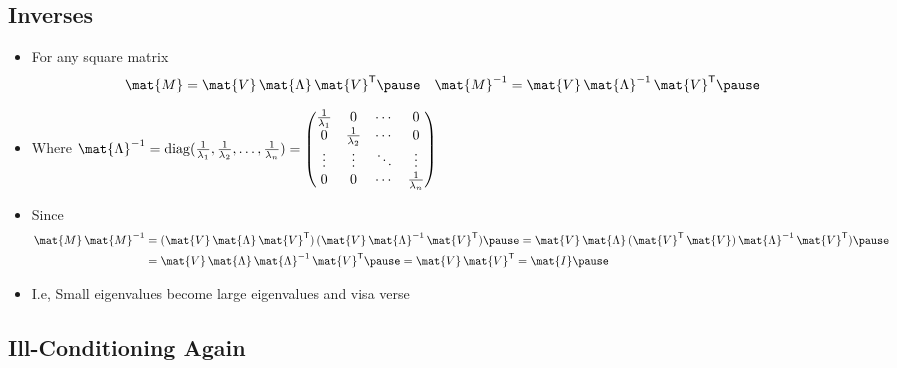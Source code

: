 \documentclass[25pt,landscape,footrule]{foils}
\begin{document}
\begin{slide}
\section[-2]{Inverses}

\begin{PauseHighLight}
  \begin{itemize}
  \item For any square matrix
    \begin{align*}
      \mat{M} &=\mat{V}\,\mat{\Lambda}\,\mat{V}^\tr \pause &
      \mat{M}^{-1} &=\mat{V}\,\mat{\Lambda}^{-1}\,\mat{V}^\tr \pause 
    \end{align*}
  \item Where $\mat{\Lambda}^{-1} = \diag(\tfrac{1}{\lambda_1},
    \tfrac{1}{\lambda_2}, \ldots, \tfrac{1}{\lambda_n}) =
    \begin{pmatrix}
      \tfrac{1}{\lambda_1} & 0 & \cdots & 0 \\
      0 & \tfrac{1}{\lambda_2}  & \cdots & 0 \\
      \vdots & \vdots &\ddots &\vdots \\
      0 & 0 & \cdots & \tfrac{1}{\lambda_n}
    \end{pmatrix}$\pause
  \item Since
    \begin{align*}
       \mat{M}\,\mat{M}^{-1} &= (\mat{V}\,\mat{\Lambda}\,\mat{V}^\tr)\,
       (\mat{V}\,\mat{\Lambda}^{-1}\,\mat{V}^\tr)\pause
       = \mat{V}\,\mat{\Lambda}\,(\mat{V}^\tr\,
       \mat{V})\,\mat{\Lambda}^{-1}\,\mat{V}^\tr)\pause \\
       &= \mat{V}\,\mat{\Lambda}\,\mat{\Lambda}^{-1}\,\mat{V}^\tr\pause
       = \mat{V}\,\mat{V}^\tr = \mat{I}\pause
    \end{align*}
  \item I.e, Small eigenvalues become large eigenvalues and visa verse\pause
  \end{itemize}
\end{PauseHighLight}

\end{slide}


\begin{slide}
\section[-1.5]{Ill-Conditioning Again}

\pb\pause{}
\begin{center}
  \pause
\end{center}

\end{slide}
\end{document}

